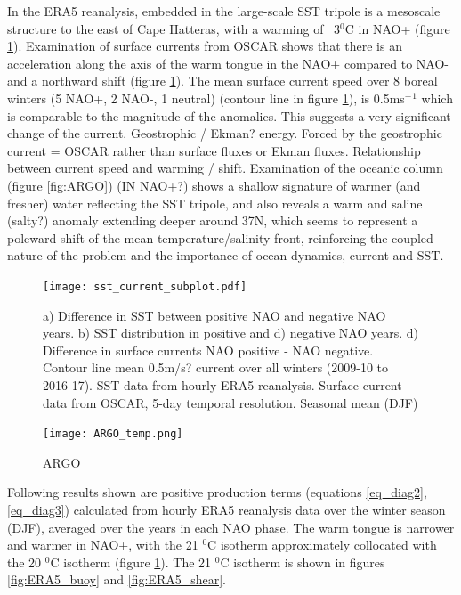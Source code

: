 In the ERA5 reanalysis, embedded in the large-scale SST tripole is a mesoscale structure to the east of Cape Hatteras, with a warming of ~3$^{0}$C in NAO+ (figure \ref{fig:subplot1}). Examination of surface currents from OSCAR \citep{Bonjean2002} shows that there is an acceleration along the axis of the warm tongue in the NAO+ compared to NAO- and a northward shift (figure \ref{fig:subplot1}). The mean surface current speed over 8 boreal winters (5 NAO+, 2 NAO-, 1 neutral) (contour line in figure \ref{fig:subplot1}), is 0.5ms$^-$$^1$ which is comparable to the magnitude of the anomalies. This suggests a very significant change of the current. Geostrophic / Ekman? energy. Forced by the geostrophic current = OSCAR rather than surface fluxes or Ekman fluxes. Relationship between current speed and warming / shift. Examination of the oceanic column (figure \ref{fig:ARGO}) (IN NAO+?) shows a shallow signature of warmer (and fresher) water reflecting the SST tripole, and also reveals a warm and saline (salty?) anomaly extending deeper around 37N, which seems to represent a poleward shift of the mean temperature/salinity front, reinforcing the coupled nature of the problem and the importance of ocean dynamics, current and SST.

\begin{figure}[h]
	\centering
	\texttt{[image: sst\_current\_subplot.pdf]}
	\caption{a) Difference in SST between positive NAO and negative NAO years. b) SST distribution  in positive and d) negative NAO years. d) Difference in surface currents NAO positive - NAO negative. Contour line mean 0.5m/s? current over all winters (2009-10 to 2016-17). SST data from hourly ERA5 reanalysis. Surface current data from OSCAR, 5-day temporal resolution. Seasonal mean (DJF)}
	\label{fig:subplot1} 
\end{figure}

\begin{figure}[h]
	\centering
	\texttt{[image: ARGO\_temp.png]}
	\caption{ARGO}
	\label{fig:ARGO. CITE ARNAUD} 
\end{figure}



Following results shown are positive production terms (equations \ref{eq_diag2}, \ref{eq_diag3}) calculated from hourly ERA5 reanalysis data over the winter season (DJF), averaged over the years in each NAO phase. The warm tongue is narrower and warmer in NAO+, with the 21 $^{0}$C isotherm approximately collocated with the 20 $^{0}$C isotherm (figure \ref{fig:subplot1}). The 21 $^{0}$C isotherm is shown in figures \ref{fig:ERA5_buoy} and \ref{fig:ERA5_shear}.

